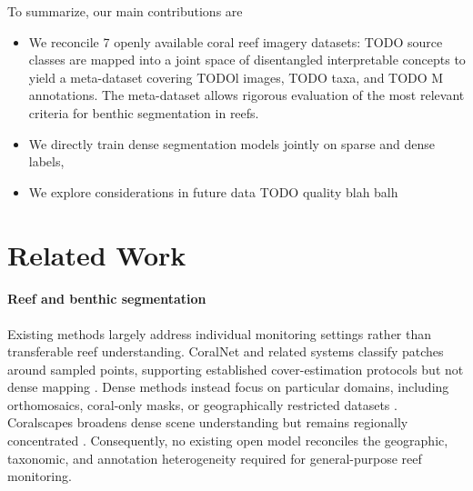 \documentclass[10pt,twocolumn,letterpaper]{article}
\begin{document}
To summarize, our main contributions are 
\begin{itemize}
   \item We reconcile 7 openly available coral reef imagery datasets: TODO source classes are mapped into a joint space of disentangled interpretable concepts to yield a meta-dataset covering TODOl images, TODO %
   taxa, and TODO M annotations. The meta-dataset allows rigorous evaluation of the most relevant criteria for benthic segmentation in reefs.
    \item We directly train dense segmentation models jointly on sparse and dense labels, 
    \item We explore considerations in future data TODO quality blah balh
\end{itemize}



\section{Related Work}


\paragraph{Reef and benthic segmentation}


Existing methods largely address individual monitoring settings rather than transferable reef understanding. CoralNet and related systems classify patches around sampled points, supporting established cover-estimation protocols but not dense mapping \citep{beijbom2012automated,beijbom2015towards,chen2021coralnet}. Dense methods instead focus on particular domains, including orthomosaics, coral-only masks, or geographically restricted datasets \citep{yuval2021repeatable,pavoni2022taglab,sauder2024deepreefmap,zheng2024coralscop}. Coralscapes broadens dense scene understanding but remains regionally concentrated \citep{sauder2025coralscapes}. Consequently, no existing open model reconciles the geographic, taxonomic, and annotation heterogeneity required for general-purpose reef monitoring.
\end{document}
